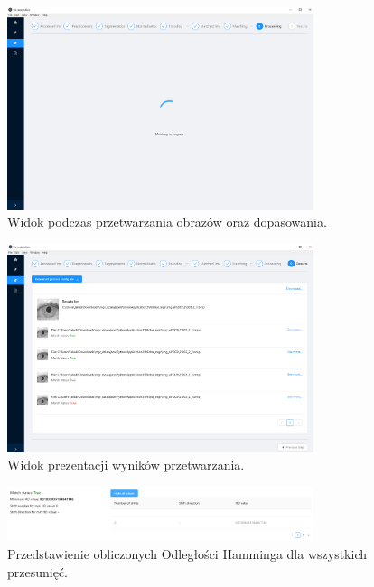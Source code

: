 \documentclass[10pt,polish,a4paper,oneside]{ppfcmthesis}
\begin{document}
\begin{figure}[ht]
  \centering
  \includegraphics[width=0.8\textwidth]{images/app/matchingProgress.png}
  \caption{Widok podczas przetwarzania obrazów oraz dopasowania.}
  \label{fig:matchingProcessing}
\end{figure}

\begin{figure}[ht]
  \centering
  \includegraphics[width=0.8\textwidth]{images/app/stepResults.png}
  \caption{Widok prezentacji wyników przetwarzania.}
  \label{fig:stepResultsScreen}
\end{figure}

\begin{figure}[ht]
  \centering
  \includegraphics[width=0.8\textwidth]{images/app/resultsPreviewTable.png}
  \caption{Przedstawienie obliczonych Odległości Hamminga dla wszystkich przesunię\'c.}
  \label{fig:stepResultHDTable}
\end{figure}
\end{document}
